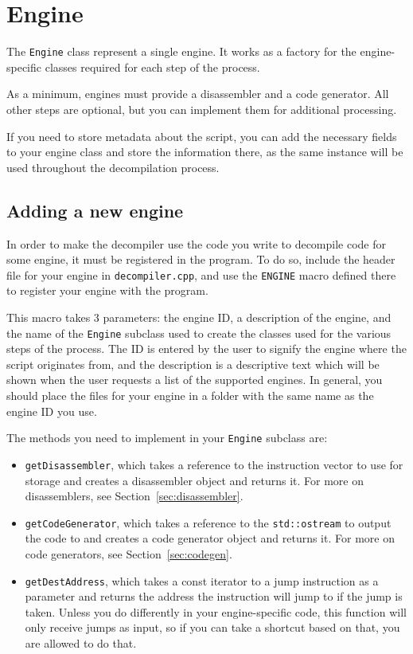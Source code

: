 \section{Engine}
The \verb+Engine+ class represent a single engine. It works as a factory for the engine-specific classes required for each step of the process.

As a minimum, engines must provide a disassembler and a code generator. All other steps are optional, but you can implement them for additional processing.

If you need to store metadata about the script, you can add the necessary fields to your engine class and store the information there, as the same instance will be used throughout the decompilation process.

\subsection{Adding a new engine}
In order to make the decompiler use the code you write to decompile code for some engine, it must be registered in the program. To do so, include the header file for your engine in \verb+decompiler.cpp+, and use the \verb+ENGINE+ macro defined there to register your engine with the program.

This macro takes 3 parameters: the engine ID, a description of the engine, and the name of the \verb+Engine+ subclass used to create the classes used for the various steps of the process. The ID is entered by the user to signify the engine where the script originates from, and the description is a descriptive text which will be shown when the user requests a list of the supported engines. In general, you should place the files for your engine in a folder with the same name as the engine ID you use.

The methods you need to implement in your \verb+Engine+ subclass are:
\begin{itemize}
\item \verb+getDisassembler+, which takes a reference to the instruction vector to use for storage and creates a disassembler object and returns it. For more on disassemblers, see Section~\vref{sec:disassembler}.
\item \verb+getCodeGenerator+, which takes a reference to the \verb+std::ostream+ to output the code to and creates a code generator object and returns it. For more on code generators, see Section~\vref{sec:codegen}.
\item \verb+getDestAddress+, which takes a const iterator to a jump instruction as a parameter and returns the address the instruction will jump to if the jump is taken. Unless you do differently in your engine-specific code, this function will only receive jumps as input, so if you can take a shortcut based on that, you are allowed to do that.
\end{itemize}

